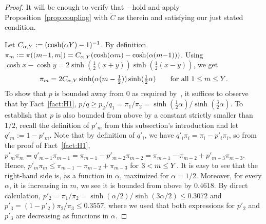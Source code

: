 \begin{proof}
It will be enough to verify that~- hold and apply
Proposition~\ref{prop:coupling} with $\widetilde{C}$ as therein and satisfying our just stated condition.

Let $C_{\alpha,Y}:=(\cosh(\alpha Y)-1)^{-1}$. By definition $\pi_m:=\pi((m{-}1,m])=C_{\alpha,Y}(\cosh(\alpha m)-\cosh(\alpha(m{-}1)))$.
Using $\cosh x-\cosh y=2\sinh(\frac12(x+y))\sinh(\frac12(x-y))$, we get
\begin{equation}\label{radial:eqn:piSinh}
\pi_{m}=2C_{\alpha,Y}\sinh(\alpha(m-\tfrac12))\sinh(\tfrac12\alpha) \qquad\text{for all $1\le m\le Y$}.
\end{equation}
To show that $p$ is bounded away from $0$ as required by~, it suffices
to observe that by Fact~\ref{fact:H1}, 
$p/q\ge p_2/q_1=\pi_1/\pi_2=\sinh(\frac12\alpha)/\sinh(\frac32\alpha)$. To establish that $p$ is also bounded from above by a constant strictly smaller than $1/2$, recall the definition of $p'_m$ from this subsection's introduction and let $q'_m:=1-p'_m$. Note that by definition of $q'_i$, we have $q'_{i}\pi_{i}=\pi_{i}-p'_{i}\pi_{i}$, so from the proof of Fact~\ref{fact:H1}, $p'_{m}\pi_{m}=q'_{m-1}\pi_{m-1}=\pi_{m-1}-p'_{m-2}\pi_{m-2}
=\pi_{m-1}-\pi_{m-2}+p'_{m-3}\pi_{m-3}$. Hence, $p'_m\pi_m\le\pi_{m-1}-\pi_{m-2}+\pi_{m-3}$ for $3<m\le Y$. It is easy to see that the right-hand side is, as a function in $\alpha$, maximized for $\alpha=1/2$. Moreover, for every $\alpha$, it is increasing in $m$, we see it is bounded from above by $0.4618$. By direct calculation, $p'_2=\pi_1/\pi_2=\sinh(\alpha/2) / \sinh(3\alpha/2) \le 0.3072$ and $p'_3=(1-p'_2)\pi_2/\pi_3 \le 0.3557$, where we used that both expressions for $p'_2$ and $p'_3$ are decreasing as functions in $\alpha$. %

\end{proof}

